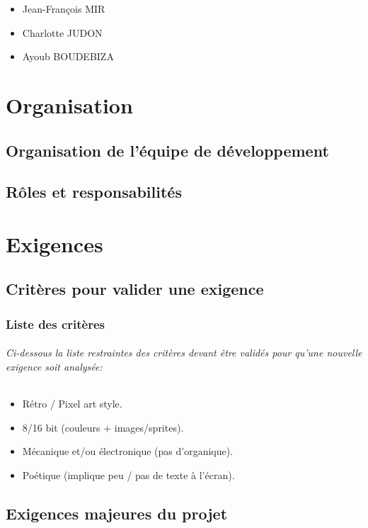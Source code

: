 \documentclass{report}
\begin{document}
\begin{itemize}
\item Jean-François MIR
\item Charlotte JUDON
\item Ayoub BOUDEBIZA
\end{itemize}

	\part{Organisation}
	\setcounter{chapter}{0}
		\chapter{Organisation de l'\'{e}quipe de d\'{e}veloppement}
		\chapter{R\^{o}les et responsabilit\'{e}s}
	
	\part{Exigences}
	\setcounter{chapter}{0}
		\chapter{Crit\`{e}res pour valider une exigence}
			\section{Liste des crit\`{e}res}

\paragraph{Ci-dessous la liste restraintes des crit\`{e}res devant être valid\'{e}s pour qu'une nouvelle exigence soit analys\'{e}e:}
\begin{itemize}
\item R\'{e}tro / Pixel art style.
\item 8/16 bit (couleurs +  images/sprites).
\item M\'{e}canique et/ou \'{e}lectronique (pas d'organique).
\item Po\'{e}tique (implique peu / pas de texte à l'\'{e}cran).
\end{itemize}

		\chapter{Exigences majeures du projet}
\end{document}
